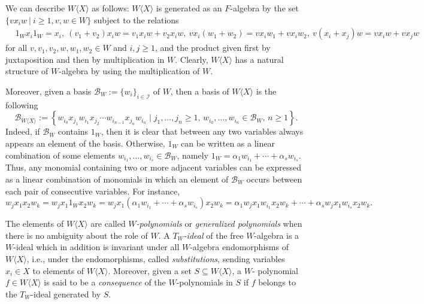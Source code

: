\documentclass[reqno]{amsart}
\theoremstyle{definition}
\numberwithin{equation}{section}
\numberwithin{theorem}{section}
\newcommand{\W}{W\langle X\rangle}
\begin{document}
	
	
	We can describe $\W$ as follows: $\W$ is generated as an $F$-algebra by the set $\{v x_i w \ | \ i\geq 1, v,w\in W\}$ subject to the relations  
    \begin{equation*}
    \begin{split}
&1_W x_i 1_W = x_i, \ (v_1 + v_2)x_i w = v_1 x_i w + v_2 x_i w, \ v x_i (w_1+w_2)=v x_i w_1 + v x_i w_2, \ v(x_i+x_j)w = vx_i w + v x_j w
    \end{split}
    \end{equation*}
    for all $v,v_1,v_2,w,w_1,w_2\in W$ and $i,j\geq 1$, and the product given first by juxtaposition and then by multiplication in $W$.  Clearly, $\W$ has a natural structure of $W$-algebra by using the multiplication of $W$.
    
    Moreover, 
    given a basis $\mathcal{B}_W:=\{w_i\}_{i\in\mathcal I}$ of $W$,
    then a basis of $\W$ is the following
	$$
	\mathcal{B}_{\W}:=\left\lbrace w_{i_0}x_{j_1}w_{i_1}x_{j_2}\cdots w_{i_{n-1}}x_{j_n}w_{i_{n}} \mid j_1,\dots,j_n\geq 1 ,\, w_{i_0},\ldots,w_{i_{n}}\in\mathcal{B}_W, \, n\geq 1\right\rbrace.
	$$
Indeed, if $\mathcal{B}_W$ contains $1_W$, then it is clear that between any two variables always appears an element of the basis. Otherwise, $1_W$ can be written as a linear combination of some elements $w_{i_1},\ldots, w_{i_s}\in \mathcal{B}_W$, namely  $1_W= \alpha_1 w_{i_1}+\cdots + \alpha_s w_{i_s}.$ Thus, any monomial containing two or more adjacent variables can be expressed as a linear combination of monomials in which an element of $\mathcal B_W$ occurs between each pair of consecutive variables. For instance,
    $$
    w_jx_1x_2w_k = w_jx_1 1_W x_2w_k = w_jx_1(\alpha_1 w_{i_1}+\cdots + \alpha_s w_{i_s})x_2w_k = \alpha_1 w_jx_1w_{i_1}x_2w_k+\cdots + \alpha_s w_jx_1w_{i_s}x_2w_k.
    $$
   

    	The elements of $\W$ are called \emph{$W$-polynomials} or \emph{generalized polynomials} when there is no ambiguity about the role of $W$.
    A \emph{$T_W$-ideal} of the free $W$-algebra is a $W$-ideal which in addition is invariant under all $W$-algebra endomorphisms of $\W$, i.e., under the endomorphisms, called \emph{substitutions}, sending variables $x_i\in X$ to elements of $\W$.
     Moreover, given a set $S\subseteq\W$, a $W$- polynomial $f\in \W$ is said to be a \emph{consequence} of the $W$-polynomials in $S$ if $f$ belongs to the $T_W$-ideal generated by $S$. %
   
\end{document}
